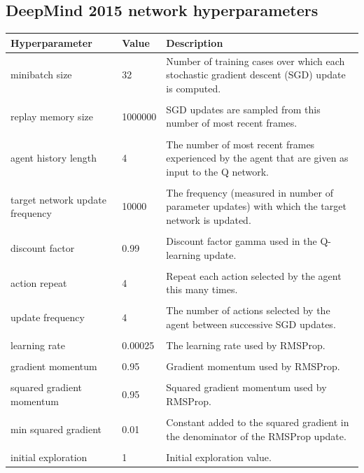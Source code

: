 \documentclass[10pt]{article}
\begin{document}
	\subsection{DeepMind 2015 network hyperparameters}
		\begin{table}[h]
\centering
\scriptsize
\begin{tabular}{p{3cm} l p{8cm}}
\textbf{Hyperparameter} & \textbf{Value} & \textbf{Description} \\ \hline
minibatch size & 32 & Number of  training cases over which each stochastic gradient descent (SGD) update is computed.\\
 & & \\
replay memory size & 1000000 & SGD updates are sampled from this number of most recent frames.\\
 & & \\
agent history length & 4 & The number of most recent frames experienced by the agent that are given as input to the Q network.\\
 & & \\
target network update frequency & 10000 & The frequency (measured in number of parameter updates) with which the target network is updated.\\
 & & \\
discount factor & 0.99 & Discount factor gamma used in the Q-learning update.\\
 & & \\
action repeat & 4 & Repeat each action selected by the agent this many times.\\
 & & \\
update frequency & 4 & The number of actions selected by the agent between successive SGD updates.\\
 & & \\
learning rate & 0.00025 & The learning rate used by RMSProp.\\
 & & \\
gradient momentum & 0.95 & Gradient momentum used by RMSProp.\\
 & & \\
squared gradient momentum & 0.95 & Squared gradient momentum used by RMSProp.\\
 & & \\
min squared gradient & 0.01 & Constant added to the squared gradient in the denominator of the RMSProp update.\\
 & & \\
initial exploration & 1 & Initial exploration value.\\

\end{tabular}
\end{table}
\end{document}

